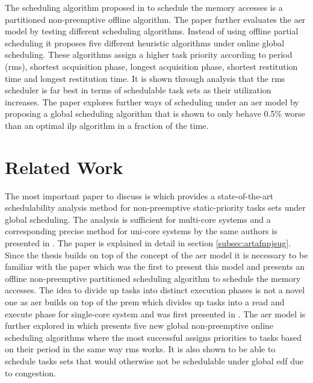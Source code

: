 \documentclass{kththesis}
\begin{document}
The scheduling algorithm proposed in \parencite{durrieu_predictable_2014} to schedule the memory
accesses is a partitioned non-preemptive offline algorithm. The paper \parencite{maia_closer_2016}
further evaluates the \acrshort{aer} model by testing different scheduling algorithms. Instead of
using offline partial scheduling it proposes five different heuristic algorithms under online global
scheduling. These algorithms assign a higher task priority according to period (\acrshort{rms}),
shortest acquisition phase, longest acquisition phase, shortest restitution time and longest
restitution time. It is shown through analysis that the \acrshort{rms} scheduler is far best in
terms of schedulable task sets as their utilization increases. The paper
\parencite{becker_contention-free_2016} explores further ways of scheduling under an \acrshort{aer}
model by proposing a global scheduling algorithm that is shown to only behave 0.5\% worse than an
optimal \acrshort{ilp} algorithm in a fraction of the time.



\section{Related Work}

The most important paper to discuss is \parencite{nasri_response-time_2018} which provides a
state-of-the-art schedulability analysis method for non-preemptive static-priority tasks sets under global
scheduling. The analysis is sufficient for multi-core systems and a corresponding precise method for
uni-core systems by the same authors is presented in \parencite{nasri_exact_2017}. The paper is
explained in detail in section \ref{subsec:artafnpjsug}. Since the thesis builds on top of the
concept of the \acrshort{aer} model it is necessary to be familiar with the paper
\parencite{durrieu_predictable_2014} which was the first to present this model and presents an
offline non-preemptive partitioned scheduling algorithm to schedule the memory accesses. The idea to divide
up tasks into distinct execution phases is not a novel one as \acrshort{aer} builds on top of the
\acrshort{prem} which divides up tasks into a read and execute phase for single-core system and was
first presented in \parencite{pellizzoni_predictable_2011}. The \acrshort{aer} model is
further explored in \parencite{maia_closer_2016} which presents five new global non-preemptive
online scheduling algorithms where the most successful assigns priorities to tasks based on their
period in the same way \acrshort{rms} works. It is also shown to be able to schedule tasks sets that
would otherwise not be schedulable under global \acrshort{edf} due to congestion.
\end{document}
